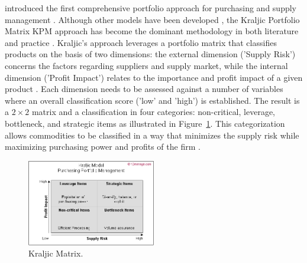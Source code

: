 \documentclass[twocolumn]{svjour3}       %
\begin{document}
\citet{k83} introduced the first comprehensive portfolio approach for purchasing and supply management \citep{gv03}.  Although other models have been developed \citep{tj96,dp02,k07}, the Kraljic Portfolio Matrix KPM approach has become the dominant methodology in both literature and practice \citep{lchp01,gv03}. Kraljic's approach leverages a portfolio matrix that classifies products on the basis of two dimensions: the external dimension ('Supply Risk') concerns the factors regarding suppliers and supply market, while the internal dimension ('Profit Impact') relates to the importance and profit impact of a given product \citep{dp02}. Each dimension needs to be assessed against a number of variables where an overall classification score ('low' and 'high') is established. The result is a $2 \times 2$ matrix and a classification in four categories: non-critical, leverage, bottleneck, and strategic items as illustrated in Figure~\ref{fig:2}. This categorization allows commodities to be classified in a way that minimizes the supply risk while maximizing purchasing power and profits of the firm \citep{pwa12}.

\begin{figure}[!htb]
  \includegraphics[width=0.5\textwidth]{kraljic-matrix.png}
  \caption{Kraljic Matrix.}
  \label{fig:2}
\end{figure}
\end{document}
